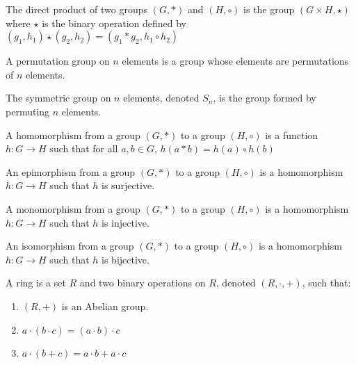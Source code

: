    \begin{definition}
        The direct product of two groups $(G,*)$ and
        $(H,\circ)$ is the group  $({G}\times{H},\star)$
        where $\star$ is the binary operation defined by
        $(g_{1},h_{1})\star(g_{2},h_{2})%
         =(g_{1}*g_{2},{h_{1}}\circ{h_{2}})$
    \end{definition}
    \begin{definition}
        A permutation group on $n$ elements is a
        group whose elements are permutations of
        $n$ elements.
    \end{definition}
    \begin{definition}
        The symmetric group on $n$ elements,
        denoted $S_{n}$, is the group formed by
        permuting $n$ elements.
    \end{definition}
    \begin{definition}
        A homomorphism from a group $(G,*)$ to
        a group $(H,\circ)$ is a function
        $h:{G}\rightarrow{H}$ such that for all
        ${a,b}\in{G}$, $h(a*b)={h(a)}\circ{h(b)}$
    \end{definition}
    \begin{definition}
        An epimorphism from a group $(G,*)$ to
        a group $(H,\circ)$ is a homomorphism
        $h:{G}\rightarrow{H}$ such that
        $h$ is surjective.
    \end{definition}
    \begin{definition}
        A monomorphism from a group $(G,*)$ to
        a group $(H,\circ)$ is a homomorphism
        $h:{G}\rightarrow{H}$ such that
        $h$ is injective.
    \end{definition}
    \begin{definition}
        An isomorphism from a group $(G,*)$ to
        a group $(H,\circ)$ is a homomorphism
        $h:{G}\rightarrow{H}$ such that
        $h$ is bijective.
    \end{definition}
    \begin{definition}
        A ring is a set $R$ and two binary operations
        on $R$, denoted $(R,\cdot,+)$, such that:
        \begin{enumerate}
            \item $(R,+)$ is an Abelian group.
            \item $a\cdot({b}\cdot{c})=({a}\cdot{b})\cdot{c}$
            \item ${a}\cdot(b+c)={a}\cdot{b}+{a}\cdot{c}$
        \end{enumerate}
    \end{definition}

